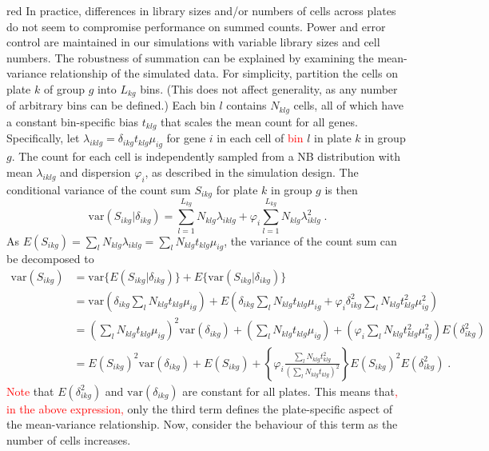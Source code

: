 \documentclass{article}
\newcommand\revised[1]{\textcolor{red}{#1}}
\begin{document}
\begin{color}{red}
In practice, differences in library sizes and/or numbers of cells across plates do not seem to compromise performance on summed counts.
Power and error control are maintained in our simulations with variable library sizes and cell numbers.
The robustness of summation can be explained by examining the mean-variance relationship of the simulated data.
For simplicity, partition the cells on plate $k$ of group $g$ into $L_{kg}$ bins.
(This does not affect generality, as any number of arbitrary bins can be defined.)
Each bin $l$ contains $N_{klg}$ cells, all of which have a constant bin-specific bias $t_{klg}$ that scales the mean count for all genes.
Specifically, let $\lambda_{iklg} = \delta_{ikg}t_{klg}\mu_{ig}$ for gene $i$ in each cell of \revised{bin} $l$ in plate $k$ in group $g$.
The count for each cell is independently sampled from a NB distribution with mean $\lambda_{iklg}$ and dispersion $\varphi_i$, as described in the simulation design.
The conditional variance of the count sum $S_{ikg}$ for plate $k$ in group $g$ is then
\[
    \mbox{var}(S_{ikg} | \delta_{ikg}) = \sum_{l=1}^{L_{kg}} N_{klg} \lambda_{iklg}  + \varphi_{i} \sum_{l=1}^{L_{kg}} N_{klg} \lambda_{iklg}^2 \;.
\]
As $E(S_{ikg}) = \sum_{l} N_{klg}\lambda_{iklg} = \sum_{l} N_{klg} t_{klg} \mu_{ig}$, the variance of the count sum can be decomposed to
\begin{align*}
    \mbox{var}(S_{ikg}) 
    &= \mbox{var}\{E(S_{ikg} | \delta_{ikg} ) \} + E\{ \mbox{var}(S_{ikg} | \delta_{ikg}) \}\\
    &= \mbox{var}\left(\delta_{ikg}\sum_{l} N_{klg} t_{klg}\mu_{ig}\right) + E\left(\delta_{ikg}\sum_{l}  N_{klg}t_{klg}\mu_{ig}  + \varphi_{i} \delta_{ikg}^2 \sum_{l}  N_{klg}t_{klg}^2\mu_{ig}^2\right)\\
    &= \left(\sum_{l} N_{klg} t_{klg}\mu_{ig} \right)^2 \mbox{var}(\delta_{ikg}) + \left(\sum_{l} N_{klg} t_{klg}\mu_{ig}\right) + \left( \varphi_i \sum_{l}  N_{klg}t_{klg}^2\mu_{ig}^2 \right) E(\delta_{ikg}^2) \\
    &= E(S_{ikg})^2 \mbox{var}(\delta_{ikg}) + E(S_{ikg}) + \left\{ \varphi_i \frac{\sum_{l} N_{klg} t_{klg}^2}{ (\sum_{l} N_{klg} t_{klg})^2}  \right\} E(S_{ikg})^2 E(\delta_{ikg}^2) \;. 
\end{align*}
\revised{Note} that $E(\delta_{ikg}^2)$ and $\mbox{var}(\delta_{ikg})$ are constant for all plates.
This means that\revised{, in the above expression,} only the third term defines the plate-specific aspect of the mean-variance relationship.
Now, consider the behaviour of this term as the number of cells increases.

\end{color}
\end{document}
